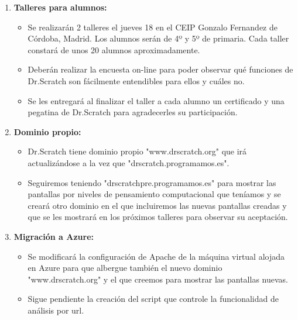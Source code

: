 \documentclass[a4paper,12pt]{letter}
\begin{document}
\begin{letter}
\begin{enumerate}
    
    \item{\textbf {Talleres para alumnos:}}
    \begin{itemize}
            \item {Se realizarán 2 talleres el jueves 18 en el CEIP Gonzalo 
                    Fernandez de Córdoba, Madrid. Los alumnos serán de 4º y 5º
                    de primaria. Cada taller constará de unos 20 alumnos
                    aproximadamente.}
            \item {Deberán realizar la encuesta on-line para poder observar
                    qué funciones de Dr.Scratch son fácilmente entendibles para
                    ellos y cuáles no.}
            \item {Se les entregará al finalizar el taller a cada alumno un 
                    certificado y una pegatina de Dr.Scratch para agradecerles
                    su participación.}
    \end{itemize}
    
    \item{\textbf {Dominio propio:}}
    \begin{itemize}
            \item {Dr.Scratch tiene dominio propio "www.drscratch.org" que irá 
                    actualizándose a la vez que "drscratch.programamos.es".}
            \item {Seguiremos teniendo "drscratchpre.programamos.es" para 
                    mostrar las pantallas por niveles de pensamiento computacional
                    que teníamos y se creará otro dominio en el que incluiremos
                    las nuevas pantallas creadas y que se les mostrará en los
                    próximos talleres para observar su aceptación.}
    \end{itemize}

    \item{\textbf {Migración a Azure:}}
    \begin{itemize}
        \item {Se modificará la configuración de Apache de la máquina virtual
                alojada en Azure para que albergue también el nuevo dominio 
                "www.drscratch.org" y el que creemos para mostrar las pantallas
                nuevas.}
        \item {Sigue pendiente la creación del script que controle la funcionalidad
                de análisis por url.}
    \end{itemize}


\end{enumerate}

\end{letter}
\end{document}

